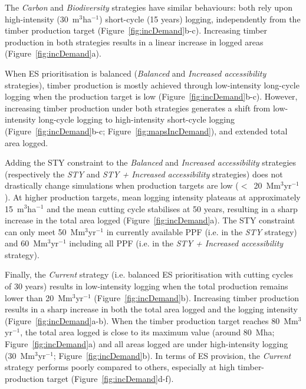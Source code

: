 \documentclass[12pt]{article}
\begin{document}
The \textit{Carbon} and \textit{Biodiversity} strategies have similar behaviours: both rely upon high-intensity (30~m$^3$ha$^{-1}$) short-cycle (15 years) logging, independently from the timber production target (Figure~\ref{fig:incDemand}b-c). Increasing timber production in both strategies results in a linear increase in logged areas (Figure~\ref{fig:incDemand}a).

When ES prioritisation is balanced (\textit{Balanced} and \textit{Increased accessibility} strategies), timber production is mostly achieved through low-intensity long-cycle logging when the production target is low (Figure~\ref{fig:incDemand}b-c). However, increasing timber production under both strategies generates a shift from low-intensity long-cycle logging to high-intensity short-cycle logging (Figure~\ref{fig:incDemand}b-c; Figure~\ref{fig:mapsIncDemand}), and extended total area logged.

Adding the STY constraint to the \textit{Balanced} and \textit{Increased accessibility} strategies (respectively the \textit{STY} and \textit{STY + Increased accessibility} strategies) does not drastically change simulations when production targets are low ($<$~20~Mm$^3$yr$^{-1}$). At higher production targets, mean logging intensity plateaus at approximately 15~m$^3$ha$^{-1}$ and the mean cutting cycle stabilises at 50 years, resulting in a sharp increase in the total area logged (Figure~\ref{fig:incDemand}a). The STY constraint can only meet 50~Mm$^3$yr$^{-1}$ in currently available PPF (i.e. in the \textit{STY} strategy) and 60~Mm$^3$yr$^{-1}$ including all PPF (i.e. in the \textit{STY + Increased accessibility} strategy).

Finally, the \textit{Current} strategy (i.e. balanced ES prioritisation with cutting cycles of 30 years) results in low-intensity logging when the total production remains lower than 20~Mm$^3$yr$^{-1}$ (Figure~\ref{fig:incDemand}b). Increasing timber production results in a sharp increase in both the total area logged and the logging intensity (Figure~\ref{fig:incDemand}a-b). When the timber production target reaches 80~Mm$^3$yr$^{-1}$, the total area logged is close to its maximum value (around 80~Mha; Figure~\ref{fig:incDemand}a) and all areas logged are under high-intensity logging (30~Mm$^3$yr$^{-1}$; Figure~\ref{fig:incDemand}b). In terms of ES provision, the \textit{Current} strategy performs poorly compared to others, especially at high timber-production target (Figure~\ref{fig:incDemand}d-f).
\end{document}

